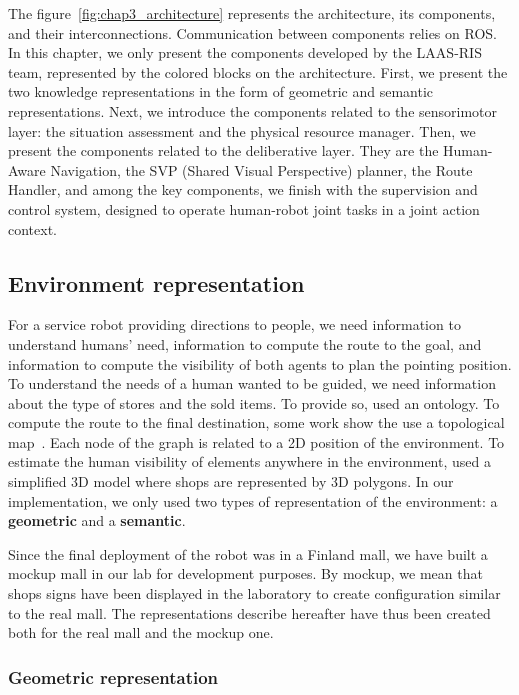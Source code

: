 \documentclass[a4paper,11pt,twoside]{StyleThese}
\begin{document}
The figure~\ref{fig:chap3_architecture} represents the architecture, its components, and their interconnections. Communication between components relies on ROS. In this chapter, we only present the components developed by the LAAS-RIS team, represented by the colored blocks on the architecture. First, we present the two knowledge representations in the form of geometric and semantic representations. Next, we introduce the components related to the sensorimotor layer: the situation assessment and the physical resource manager. Then, we present the components related to the deliberative layer. They are the Human-Aware Navigation, the SVP (Shared Visual Perspective) planner, the Route Handler, and among the key components, we finish with the supervision and control system, designed to operate human-robot joint tasks in a joint action context. 

\subsection{Environment representation}\label{subsec:models}

For a service robot providing directions to people, we need information to understand humans' need, information to compute the route to the goal, and information to compute the visibility of both agents to plan the pointing position. To understand the needs of a human wanted to be guided, we need information about the type of stores and the sold items. To provide so, \cite{satake_2015_field, satake_2015_should} used an ontology. To compute the route to the final destination, some work show the use a topological map~\citep{matsumoto_2012_you,okuno_2009_providing}. Each node of the graph is related to a 2D position of the environment. To estimate the human visibility of elements anywhere in the environment, \cite{matsumoto_2012_you} used a simplified 3D model where shops are represented by 3D polygons. In our implementation, we only used two types of representation of the environment: a \textbf{geometric} and a \textbf{semantic}.

Since the final deployment of the robot was in a Finland mall, we have built a mockup mall in our lab for development purposes. By mockup, we mean that shops signs have been displayed in the laboratory to create configuration similar to the real mall. The representations describe hereafter have thus been created both for the real mall and the mockup one.

\subsubsection{Geometric representation}
\end{document}
